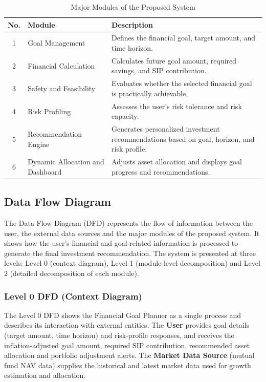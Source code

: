 \begin{table}[h!]
	\centering
	\caption{Major Modules of the Proposed System}
	\label{tab:modules}
	\vspace*{5pt}
	{\singlespacing\small
	\begin{tabular}{|c|p{4cm}|p{6.5cm}|}
		\hline
		\textbf{No.} & \textbf{Module} & \textbf{Description} \\ \hline
		1 & Goal Management & Defines the financial goal, target amount, and time horizon. \\ \hline
		2 & Financial Calculation & Calculates future goal amount, required savings, and SIP contribution. \\ \hline
		3 & Safety and Feasibility & Evaluates whether the selected financial goal is practically achievable. \\ \hline
		4 & Risk Profiling & Assesses the user's risk tolerance and risk capacity. \\ \hline
		5 & Recommendation Engine & Generates personalized investment recommendations based on goal, horizon, and risk profile. \\ \hline
		6 & Dynamic Allocation and Dashboard & Adjusts asset allocation and displays goal progress and recommendations. \\ \hline
	\end{tabular}}
\end{table}

\subsection{Data Flow Diagram}
The Data Flow Diagram (DFD) represents the flow of information between the user, the external data sources and the major modules of the proposed system. It shows how the user's financial and goal-related information is processed to generate the final investment recommendation. The system is presented at three levels: Level 0 (context diagram), Level 1 (module-level decomposition) and Level 2 (detailed decomposition of each module).

\subsubsection{Level 0 DFD (Context Diagram)}
The Level 0 DFD shows the Financial Goal Planner as a single process and describes its interaction with external entities. The \textbf{User} provides goal details (target amount, time horizon) and risk-profile responses, and receives the inflation-adjusted goal amount, required SIP contribution, recommended asset allocation and portfolio adjustment alerts. The \textbf{Market Data Source} (mutual fund NAV data) supplies the historical and latest market data used for growth estimation and allocation.

